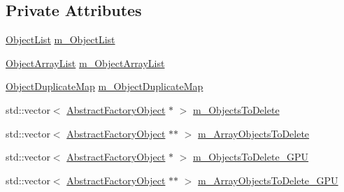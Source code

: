 \subsection*{Private Attributes}
\begin{DoxyCompactItemize}
\item 
\mbox{\hyperlink{classnjli_1_1_world_factory_a987ddbccec6101d2a0ca72f9ecfc0249}{Object\+List}} \mbox{\hyperlink{classnjli_1_1_world_factory_ad8c7adb588d481784128249f971d0bde}{m\+\_\+\+Object\+List}}
\item 
\mbox{\hyperlink{classnjli_1_1_world_factory_a0b1357052d11887d1561fbd882acd177}{Object\+Array\+List}} \mbox{\hyperlink{classnjli_1_1_world_factory_a0502a6e72721c46c66ce443e5d051085}{m\+\_\+\+Object\+Array\+List}}
\item 
\mbox{\hyperlink{classnjli_1_1_world_factory_a15eec8c4710c8ec66e7cd06dd2327be6}{Object\+Duplicate\+Map}} \mbox{\hyperlink{classnjli_1_1_world_factory_a1adb9a8f15198258dd3bbe3bedd2de2b}{m\+\_\+\+Object\+Duplicate\+Map}}
\item 
std\+::vector$<$ \mbox{\hyperlink{classnjli_1_1_abstract_factory_object}{Abstract\+Factory\+Object}} $\ast$ $>$ \mbox{\hyperlink{classnjli_1_1_world_factory_ad703b2808e6be7e94ba5b61211c949c1}{m\+\_\+\+Objects\+To\+Delete}}
\item 
std\+::vector$<$ \mbox{\hyperlink{classnjli_1_1_abstract_factory_object}{Abstract\+Factory\+Object}} $\ast$$\ast$ $>$ \mbox{\hyperlink{classnjli_1_1_world_factory_a821440f3468d369e02db2c330a8a7f66}{m\+\_\+\+Array\+Objects\+To\+Delete}}
\item 
std\+::vector$<$ \mbox{\hyperlink{classnjli_1_1_abstract_factory_object}{Abstract\+Factory\+Object}} $\ast$ $>$ \mbox{\hyperlink{classnjli_1_1_world_factory_acca9a185d035f2608b88c7b9c23251cd}{m\+\_\+\+Objects\+To\+Delete\+\_\+\+G\+PU}}
\item 
std\+::vector$<$ \mbox{\hyperlink{classnjli_1_1_abstract_factory_object}{Abstract\+Factory\+Object}} $\ast$$\ast$ $>$ \mbox{\hyperlink{classnjli_1_1_world_factory_a86927dab3f098606f3ccdc8e6c1c341d}{m\+\_\+\+Array\+Objects\+To\+Delete\+\_\+\+G\+PU}}
\end{DoxyCompactItemize}
